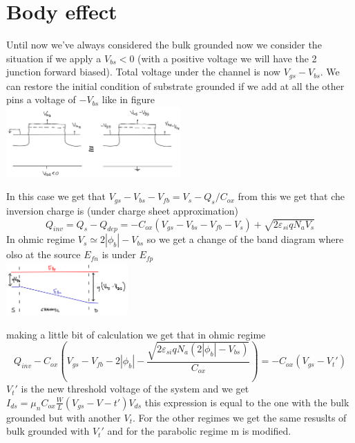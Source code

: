\section{Body effect}
Until now we've always considered the bulk grounded now we consider the situation if we apply a $V_{bs}<0$ (with a positive voltage we will have the 2 junction forward biased). Total voltage under the channel is now $V_{gs}-V_{bs}$. We can restore the initial condition of substrate grounded if we add at all the other pins a voltage of $-V_{bs}$ like in figure\\

\centering
\includegraphics[width=0.5\textwidth]{body1.png}\\
\raggedright

In this case we get that $V_{gs}-V_{bs}-V_{fb}=V_s-Q_s/C_{ox}$ from this we get that che inversion charge is (under charge sheet approximation) 
\begin{equation}
Q_{inv}=Q_s-Q_{dep}=-C_{ox}(V_{gs}-V_{bs}-V_{fb}-V_s)+\sqrt{2\varepsilon_{si}qN_aV_s}
\end{equation}
In ohmic regime $V_s\simeq 2|\phi_b|-V_{bs}$ so we get a change of the band diagram where olso at the source $E_{fn}$ is under $E_{fp}$ \\

\centering
\includegraphics[width=0.35\textwidth]{body2.png}\\
\raggedright

making a little bit of calculation we get that in ohmic regime
\begin{equation}
Q_{inv}-C_{ox}(V_{gs}-V_{fb}-2|\phi_b|-\frac{\sqrt{2\varepsilon_{si}qN_a(2|\phi_b|-V_{bs})}}{C_{ox}})=-C_{ox}(V_{gs}-V_t')
\end{equation}
$V_t'$ is the new threshold voltage of the system and we get $I_{ds}=\mu_nC_{ox}\frac{W}{L}(V_{gs}-V-t')V_{ds}$ this expression is equal to the one with the bulk grounded but with another $V_t$. For the other regimes we get the same resuslts of bulk grounded with $V_t'$ and for the parabolic regime m is modified.\\

